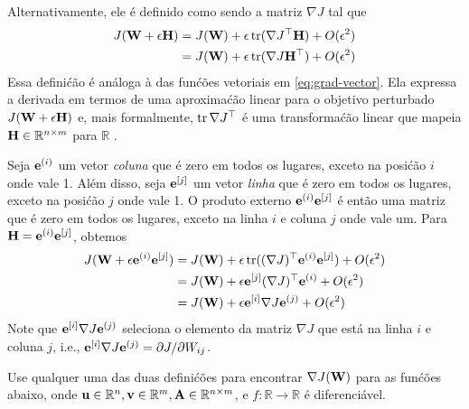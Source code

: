 Alternativamente, ele \'e definido como sendo a matriz $\nabla J$ tal que
\begin{align}
    J(\mathbf{W}+\epsilon \mathbf{H}) &= J(\mathbf{W}) + \epsilon \operatorname{tr}(\nabla J^\top \mathbf{H}) + O(\epsilon^2) \label{eq:grad-matrix-alt}\\
    &= J(\mathbf{W}) + \epsilon \operatorname{tr}(\nabla J \mathbf{H}^\top) + O(\epsilon^2)
\end{align}
Essa defini\'c\~ao \'e an\'aloga \`a das fun\'c\~oes vetoriais
em \eqref{eq:grad-vector}. Ela expressa a derivada em termos de uma aproxima\'c\~ao
linear para o objetivo perturbado $J(\mathbf{W}+\epsilon \mathbf{H})$ e, mais formalmente,
$\operatorname{tr} \nabla J^\top$ \'e uma transforma\'c\~ao linear que mapeia
$\mathbf{H} \in \mathbb{R}^{n \times m}$ para $\mathbb{R}$ \citep[veja e.g.,][Cap\'itulo 9, para um tratamento formal de derivadas]{Rudin1976}.

Seja $\mathbf{e}^{(i)}$ um vetor \emph{coluna} que \'e zero em todos os lugares, exceto na posi\'c\~ao $i$
onde vale 1. Al\'em disso, seja $\mathbf{e}^{[j]}$ um vetor \emph{linha} que \'e
zero em todos os lugares, exceto na posi\'c\~ao $j$ onde vale 1. O produto externo
$\mathbf{e}^{(i)}\mathbf{e}^{[j]}$ \'e ent\~ao uma matriz que \'e zero em todos os lugares, exceto na linha $i$ e
coluna $j$ onde vale um. Para $\mathbf{H} = \mathbf{e}^{(i)} \mathbf{e}^{[j]}$, obtemos
\begin{align}
    J(\mathbf{W}+\epsilon \mathbf{e}^{(i)}\mathbf{e}^{[j]}) &= J(\mathbf{W}) + \epsilon \operatorname{tr}((\nabla J)^\top \mathbf{e}^{(i)} \mathbf{e}^{[j]}) + O(\epsilon^2)\\
    &= J(\mathbf{W}) + \epsilon  \mathbf{e}^{[j]} (\nabla J)^\top \mathbf{e}^{(i)} + O(\epsilon^2)\\
    &= J(\mathbf{W}) + \epsilon \mathbf{e}^{[i]} \nabla J  \mathbf{e}^{(j)}+O(\epsilon^2)
\end{align}
Note que $\mathbf{e}^{[i]} \nabla J \mathbf{e}^{(j)}$ seleciona o elemento da
matriz $\nabla J$ que est\'a na linha $i$ e coluna $j$, i.e., $\mathbf{e}^{[i]} \nabla J
\mathbf{e}^{(j)}=\partial J/\partial W_{ij}$.

Use qualquer uma das duas defini\'c\~oes para encontrar $\nabla
J(\mathbf{W})$ para as fun\'c\~oes abaixo, onde
$\mathbf{u} \in \mathbb{R}^n, \mathbf{v} \in \mathbb{R}^m, \mathbf{A} \in \mathbb{R}^{n \times m}$, e
$f: \mathbb{R} \rightarrow \mathbb{R}$ \'e diferenci\'avel.

